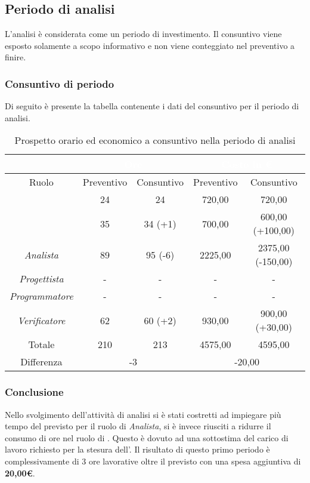 \subsection{Periodo di analisi}
L'analisi è considerata come un periodo di investimento. Il consuntivo viene esposto solamente a scopo informativo e non viene conteggiato nel preventivo a finire.
\subsubsection{Consuntivo di periodo}
Di seguito è presente la tabella contenente i dati del consuntivo per il periodo di analisi.
\begin{table}[H]
	\centering
	\begin{tabular}{|c|c|c|c|c|}
		\rowcolor{darkblue} 
		&\multicolumn{2}{c|}{\textcolor{white}{Ore}}&\multicolumn{2}{c|}{\textcolor{white}{Costo in €}}\\ \hline
		Ruolo				&	Preventivo			&	Consuntivo		&	Preventivo	&	Consuntivo\\ \hline
		{\Responsabile}		&	24					&	24				&	720,00		&	720,00 \\ \hline
		{\Amministratore}	&	35					&	34 (+1)			&	700,00		&	600,00 (+100,00) \\ \hline
		\textit{Analista}	&	89					&	95 (-6)			&	2225,00		&	2375,00 (-150,00) \\ \hline
		\textit{Progettista}& 	-					&	- 				& 	-			&  	- \\ \hline
		\textit{Programmatore}& -					& 	-				& 	-			&  	- \\ \hline
		\textit{Verificatore}&	62					&	60 (+2)			&	930,00		&	900,00 (+30,00) \\ \hline
		Totale				&	210					&	213				&	4575,00		&	4595,00 \\ \hline
		Differenza			& 	\multicolumn{2}{c|}{-3} 				& \multicolumn{2}{c|}{-20,00}\\ \hline
	\end{tabular}
	\caption{Prospetto orario ed economico a consuntivo nella periodo di analisi}
\end{table}
\subsubsection{Conclusione}
Nello svolgimento dell'attività di analisi si è stati costretti ad impiegare più tempo del previsto per il ruolo di \textit{Analista}, si è invece riusciti a ridurre il consumo di ore nel ruolo di {\Amministratore}. Questo è dovuto ad una sottostima del carico di lavoro richiesto per la stesura dell'. Il risultato di questo primo periodo è complessivamente di 3 ore lavorative oltre il previsto con una spesa aggiuntiva di \textbf{20,00€}.\\
